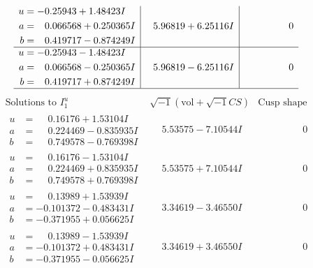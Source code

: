 \documentclass[1p]{elsarticle_modified}
\theoremstyle{definition}
\newcommand{\I}{\sqrt{-1}}
\begin{document}
$$\begin{array}{c|c|c}
\begin{aligned}
u &= -0.25943 + 1.48423 I \\
a &= \phantom{-}0.066568 + 0.250365 I \\
b &= \phantom{-}0.419717 - 0.874249 I\end{aligned}
 & \phantom{-}5.96819 + 6.25116 I & \phantom{-0.000000 } 0 \\ \hline\begin{aligned}
u &= -0.25943 - 1.48423 I \\
a &= \phantom{-}0.066568 - 0.250365 I \\
b &= \phantom{-}0.419717 + 0.874249 I\end{aligned}
 & \phantom{-}5.96819 - 6.25116 I & \phantom{-0.000000 } 0\\
 \hline 
 \end{array}$$\newpage$$\begin{array}{c|c|c}  
\text{Solutions to }I^u_{1}& \I (\text{vol} + \sqrt{-1}CS) & \text{Cusp shape}\\
 \hline 
\begin{aligned}
u &= \phantom{-}0.16176 + 1.53104 I \\
a &= \phantom{-}0.224469 - 0.835935 I \\
b &= \phantom{-}0.749578 - 0.769398 I\end{aligned}
 & \phantom{-}5.53575 - 7.10544 I & \phantom{-0.000000 } 0 \\ \hline\begin{aligned}
u &= \phantom{-}0.16176 - 1.53104 I \\
a &= \phantom{-}0.224469 + 0.835935 I \\
b &= \phantom{-}0.749578 + 0.769398 I\end{aligned}
 & \phantom{-}5.53575 + 7.10544 I & \phantom{-0.000000 } 0 \\ \hline\begin{aligned}
u &= \phantom{-}0.13989 + 1.53939 I \\
a &= -0.101372 - 0.483431 I \\
b &= -0.371955 + 0.056625 I\end{aligned}
 & \phantom{-}3.34619 - 3.46550 I & \phantom{-0.000000 } 0 \\ \hline\begin{aligned}
u &= \phantom{-}0.13989 - 1.53939 I \\
a &= -0.101372 + 0.483431 I \\
b &= -0.371955 - 0.056625 I\end{aligned}
 & \phantom{-}3.34619 + 3.46550 I & \phantom{-0.000000 } 0 \\ \hline\begin{aligned}

\end{aligned}
\end{array}$$
\end{document}
